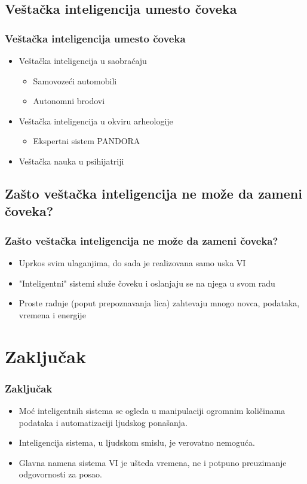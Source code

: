 \documentclass{beamer}
\begin{document}
\subsection{Veštačka inteligencija umesto čoveka}
\begin{frame}[fragile]\frametitle{Veštačka inteligencija umesto čoveka}
\begin{itemize}
    \item Veštačka inteligencija u saobraćaju
    \begin{itemize}
        \item Samovozeći automobili
        \item Autonomni brodovi
    \end{itemize}
    \item Veštačka inteligencija u okviru arheologije
    \begin{itemize}
        \item Ekspertni sistem PANDORA
    \end{itemize}
    \item Veštačka nauka u psihijatriji
    
\end{itemize}

\subsection{Zašto veštačka inteligencija ne može da zameni čoveka?}
\begin{frame}[fragile]\frametitle{Zašto veštačka inteligencija ne može da zameni čoveka?}

\begin{itemize}
    \item Uprkos svim ulaganjima, do sada je realizovana samo uska VI
    \item "Inteligentni" sistemi služe čoveku i oslanjaju se na njega u svom radu
    \item Proste radnje (poput prepoznavanja lica) zahtevaju mnogo novca, podataka, vremena i energije
\end{itemize}

\end{frame}

\section{Zaključak}

\begin{frame}[fragile]\frametitle{Zaključak}
        \begin{itemize}
            \item Moć inteligentnih sistema se ogleda u manipulaciji ogromnim količinama podataka i automatizaciji ljudskog ponašanja.
        \item Inteligencija sistema, u ljudskom smislu, je verovatno nemoguća.
        \item Glavna namena sistema VI je ušteda vremena, ne i potpuno preuzimanje odgovornosti za posao.
        \end{itemize}
\end{frame}

\end{frame}
\end{document}
